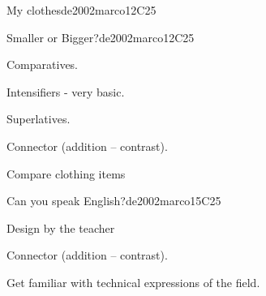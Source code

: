 \begin{syllabus}
\begin{unit}{My clothes}{}{de2002marco}{12}{C25}
\end{unit}

\begin{unit}{Smaller or Bigger?}{}{de2002marco}{12}{C25}
   \begin{topics}
      \item Comparatives.
      \item Intensifiers - very basic.
      \item Superlatives.
      \item Connector (addition – contrast).
   \end{topics}

   \begin{learningoutcomes}
      \item Compare clothing items
   \end{learningoutcomes}
\end{unit}

\begin{unit}{Can you speak English?}{}{de2002marco}{15}{C25}
   \begin{topics}
      \item Design by the teacher
      \item Connector (addition – contrast).
   \end{topics}

   \begin{learningoutcomes}
      \item Get familiar with technical expressions of the field.
   \end{learningoutcomes}
\end{unit}

\begin{coursebibliography}
\end{coursebibliography}
\end{syllabus}
%
